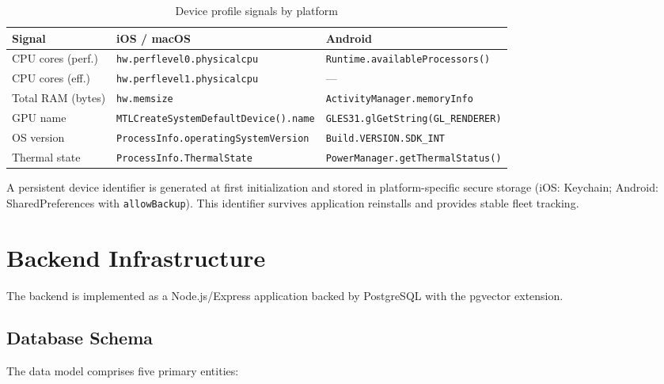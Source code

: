 \documentclass[12pt, letterpaper, twoside]{report}
\begin{document}
\begin{table}[H]
\centering
\caption{Device profile signals by platform}
\label{tab:profile_signals}
{\small
\begin{tabular}{@{}p{3.2cm}p{5.5cm}p{5.5cm}@{}}
\toprule
\textbf{Signal} & \textbf{iOS / macOS} & \textbf{Android} \\
\midrule
CPU cores (perf.) & \texttt{\small hw.perflevel0.\allowbreak physicalcpu} & \texttt{\small Runtime.\allowbreak availableProcessors()} \\[4pt]
CPU cores (eff.) & \texttt{\small hw.perflevel1.\allowbreak physicalcpu} & --- \\[4pt]
Total RAM (bytes) & \texttt{\small hw.memsize} & \texttt{\small ActivityManager.\allowbreak memoryInfo} \\[4pt]
GPU name & \texttt{\small MTLCreateSystem\-DefaultDevice().name} & \texttt{\small GLES31.glGetString\-(GL\_RENDERER)} \\[4pt]
OS version & \texttt{\small ProcessInfo.\allowbreak operatingSystemVersion} & \texttt{\small Build.VERSION.\allowbreak SDK\_INT} \\[4pt]
Thermal state & \texttt{\small ProcessInfo.\allowbreak ThermalState} & \texttt{\small PowerManager.\allowbreak getThermalStatus()} \\
\bottomrule
\end{tabular}
}
\end{table}

A persistent device identifier is generated at first initialization and stored in platform-specific secure storage (iOS: Keychain; Android: SharedPreferences with \texttt{allowBackup}). This identifier survives application reinstalls and provides stable fleet tracking.

\section{Backend Infrastructure}
\label{sec:backend}

The backend is implemented as a Node.js/Express application backed by PostgreSQL with the pgvector extension.

\subsection{Database Schema}
\label{subsec:db_schema}

The data model comprises five primary entities:
\end{document}
